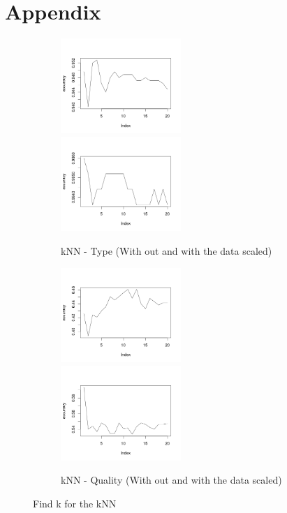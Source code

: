 \documentclass[twoside]{article}
\begin{document}
\section*{Appendix}
\begin{figure}[H]
\centering
\begin{subfigure}[b]{\textwidth}
\includegraphics[width=0.5\textwidth]{img/KNN-Type(Not-Scaled).png}
\includegraphics[width=0.5\textwidth]{img/KNN-Type(Scaled).png}
\caption{kNN - Type (With out and with the data scaled)}
\end{subfigure}

\begin{subfigure}[b]{\textwidth}
\includegraphics[width=0.5\textwidth]{img/KNN-Quality(Not-Scaled).png}
\includegraphics[width=0.5\textwidth]{img/KNN-Quality(Scaled).png}
\caption{kNN - Quality (With out and with the data scaled)}
\end{subfigure}
\label{fig:findK}
\caption{Find k for the kNN}
\end{figure}



\end{document}
